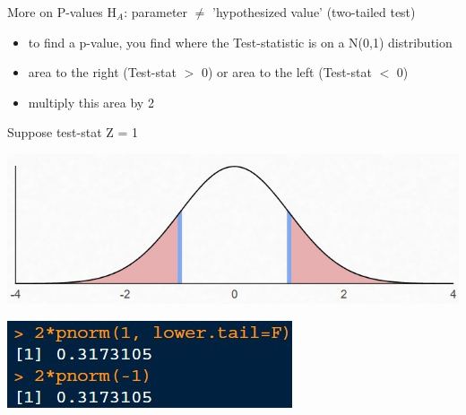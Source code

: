 \documentclass{beamer}
\begin{document}
\begin{frame}{More on P-values}
H$_A$: parameter $\neq$ 'hypothesized value' (two-tailed test)
\begin{itemize}
    \item to find a p-value, you find where the Test-statistic is on a N(0,1) distribution
    \item area to the right (Test-stat $>$ 0) or area to the left (Test-stat $<$ 0)
    \item multiply this area by 2
\end{itemize} \vspace{2mm}

Suppose test-stat Z = 1
\begin{center}
    \includegraphics[scale=.7]{img/standardnormal_pvalue3.jpg}
    
    \includegraphics[scale=1]{img/Rpval3.jpg}
\end{center}
\end{frame}
\end{document}
